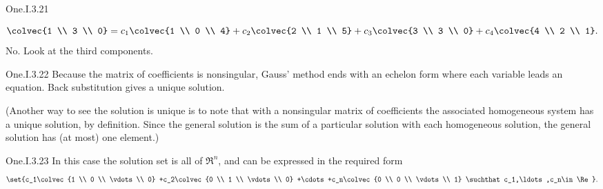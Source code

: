 \begin{ans}{One.I.3.21}
\begin{exparts}
\begin{equation*}
              \colvec{1 \\ 3 \\ 0}=
              c_1\colvec{1 \\ 0 \\ 4}+
              c_2\colvec{2 \\ 1 \\ 5}+
              c_3\colvec{3 \\ 3 \\ 0}+
              c_4\colvec{4 \\ 2 \\ 1}.
            \end{equation*}
          \partsitem No.
            Look at the third components.
        \end{exparts}
      
\end{ans}
\begin{ans}{One.I.3.22}
        Because the matrix of coefficients is nonsingular, Gauss' method
        ends with an echelon form where each variable leads an equation.
        Back substitution gives a unique solution.

      (Another way to see the solution is unique is to note that
      with a nonsingular matrix of coefficients the associated
      homogeneous system has a unique solution, by definition.
      Since the general solution is the sum of a particular solution with
      each homogeneous solution, the general solution has
      (at most) one element.)
     
\end{ans}
\begin{ans}{One.I.3.23}
      In this case the solution set is all of \( \Re^n \), and can be
      expressed in the required form
      \begin{equation*}
        \set{c_1\colvec{1 \\ 0 \\ \vdots \\ 0}
             +c_2\colvec{0 \\ 1 \\ \vdots \\ 0}
             +\cdots
             +c_n\colvec{0 \\ 0 \\ \vdots \\ 1}
             \suchthat c_1,\ldots,c_n\in\Re}.
      \end{equation*}
     
\end{ans}

